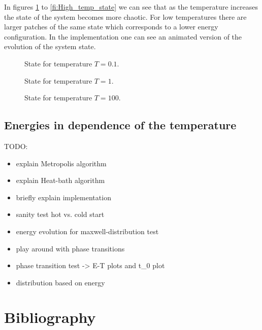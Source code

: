 In figures \ref{fi:Low_temp_state} to \ref{fi:High_temp_state} we can see that as the temperature increases the state of the system becomes more chaotic. For low temperatures there are larger patches of the same state which corresponds to a lower energy configuration. In the implementation one can see an animated version of the evolution of the system state.

\begin{figure}
\begin{minipage}{0.25\textwidth}
\centering
\graphicspath{{../../Plots/}}

\caption{State for temperature $T=0.1$.}
\label{fi:High_temp_state}
\end{minipage}
\hfill
\begin{minipage}{0.25\textwidth}
\centering
\graphicspath{{../../Plots/}}

\caption{State for temperature $T=1$.}
\label{fi:Medium_temp_state}
\end{minipage}
\hfill
\begin{minipage}{0.25\textwidth}
\centering
\graphicspath{{../../Plots/}}

\caption{State for temperature $T=100$.}
\label{fi:Low_temp_state}
\end{minipage}
\end{figure}

\subsection*{Energies in dependence of the temperature}

\begin{figure}
\centering
\graphicspath{{../../Plots/}}

\end{figure}

\newpage
TODO:
\begin{itemize}
\item explain Metropolis algorithm
\item explain Heat-bath algorithm
\item briefly explain implementation
\item sanity test hot vs. cold start
\item energy evolution for maxwell-distribution test
\item play around with phase transitions
\item phase transition test -> E-T plots and t_0 plot
\item distribution based on energy
\end{itemize}


\newpage
\section*{Bibliography}
\printbibliography[heading=none, keyword={secondary}]


